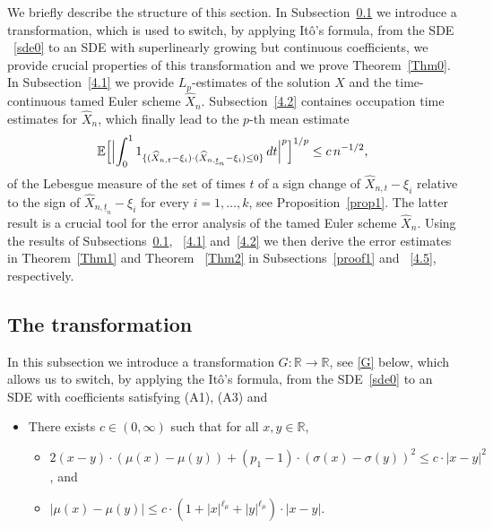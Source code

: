 \documentclass[11pt]{amsart}
\newcommand{\R}{{\mathbb R}}
\newcommand{\EE}{{\mathbb E}}
\newcommand{\eul}{{\widehat X}}
\newcommand{\ind}{1}
\newcommand{\utn}{\underline {t}_n}
\theoremstyle{plain}
\theoremstyle{definition}
\begin{document}
We briefly describe the
structure
of this section.
In Subsection~\ref{4.3} we introduce a transformation, which is used to switch, by applying It\^{o}'s formula, from the SDE ~\eqref{sde0} to an SDE with superlinearly growing but continuous coefficients, we provide  crucial properties of this transformation and we prove Theorem~\ref{Thm0}. In Subsection~\ref{4.1} we provide $L_p$-estimates
of the solution $X$ and the time-continuous tamed Euler scheme $\eul_n$. Subsection~\ref{4.2} containes  occupation time estimates for  $\eul_n$, which finally lead to the  $p$-th mean estimate
\[
\EE\Bigl[\Bigl|\int_0^1  \ind_{\{(\eul_{n,t}-\xi_i)\cdot(\eul_{n, \utn}-\xi_i)\leq 0\}}\,dt\Bigr|^p\Bigr]^{1/p}\leq c\,n^{-1/2},
\]
of the
Lebesgue measure of the set
of times $t$ of a sign change of $\eul_{n,t}-\xi_i$ relative to the sign of $\eul_{n,\utn}-\xi_i$
for every $i=1, \ldots, k$, see Proposition~\ref{prop1}. The latter result is a crucial tool for the error analysis of the tamed Euler scheme $\eul_n$. Using the results of Subsections~\ref{4.3}, ~\ref{4.1} and~\ref{4.2} we then derive the error estimates in Theorem~\ref{Thm1} and Theorem ~\ref{Thm2} in Subsections~\ref{proof1} and  ~\ref{4.5}, respectively.



\subsection{The transformation}\label{4.3}

In this subsection we introduce a transformation $G\colon\R\to\R$, see \eqref{G} below, which allows us to switch, by applying the  It\^{o}'s formula, from the SDE~\eqref{sde0} to an SDE with coefficients satisfying  (A1), (A3) and
\begin{itemize}
\item[(A2$'$)] There exists $c\in (0,\infty)$ such that
 for all $x,y\in \R$,
 \begin{itemize}
 \item[(i)]
 $2(x-y)\cdot (\mu(x)-\mu(y))+(p_1-1)\cdot (\sigma(x)-\sigma(y))^2\leq c\cdot |x-y|^2$, and\\[-.2cm]
\item[(ii)]
$|\mu(x)-\mu(y)|\leq c\cdot (1+|x|^{\ell_\mu}+|y|^{\ell_\mu})\cdot |x-y|$.\\[-.1cm]
\end{itemize}
\end{itemize}
\end{document}
